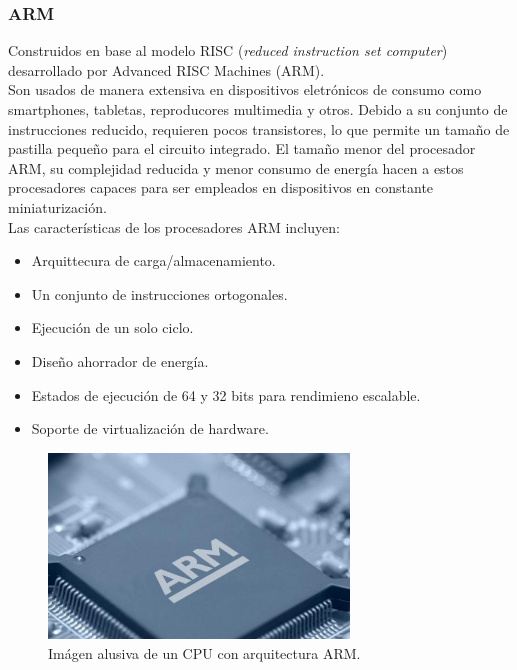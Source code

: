 \documentclass[letterpaper, 12pt]{article}
\begin{document}
\begin{justify}
        \subsubsection*{ARM}
        \justify
        Construidos en base al modelo RISC (\emph{reduced instruction set computer}) desarrollado por Advanced RISC Machines (ARM).
        \\\newline
        Son usados de manera extensiva en dispositivos eletrónicos de consumo como smartphones, tabletas, reproducores multimedia y otros. Debido a su conjunto de instrucciones reducido, requieren
        pocos transistores, lo que permite un tamaño de pastilla pequeño para el circuito integrado. El tamaño menor del procesador ARM, su complejidad reducida y menor consumo de energía hacen a estos procesadores 
        capaces para ser empleados en dispositivos en constante miniaturización.
        \\\newline
        Las características de los procesadores ARM incluyen:
        \begin{itemize}
            \item Arquittecura de carga/almacenamiento.
            \item Un conjunto de instrucciones ortogonales.
            \item Ejecución de un solo ciclo.
            \item Diseño ahorrador de energía.
            \item Estados de ejecución de 64 y 32 bits para rendimieno escalable.
            \item Soporte de virtualización de hardware.
        \end{itemize}
        \begin{figure}[H]
            \centering
            \includegraphics[width=8cm]{arm.jpeg}
            \caption{Imágen alusiva de un CPU con arquitectura ARM.}
        \end{figure}

\end{justify}
\end{document}
